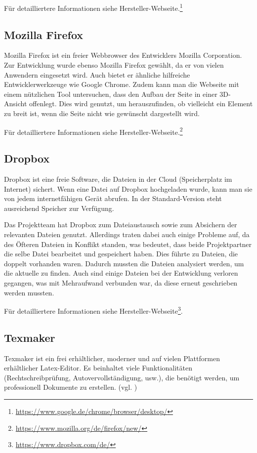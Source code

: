 Für detailliertere Informationen siehe Hersteller-Webseite.\footnote{\url{https://www.google.de/chrome/browser/desktop/}} \\ 

\subsection{Mozilla Firefox}
Mozilla Firefox ist ein freier Webbrowser des Entwicklers Mozilla Corporation. 
Zur Entwicklung wurde ebenso Mozilla Firefox gewählt, da er von vielen Anwendern eingesetzt wird. Auch bietet er ähnliche hilfreiche Entwicklerwerkzeuge wie Google Chrome. Zudem kann man die Webseite mit einem nützlichen Tool untersuchen, dass den Aufbau der Seite in einer 3D-Ansicht offenlegt. Dies wird genutzt, um herauszufinden, ob vielleicht ein Element zu breit ist, wenn die Seite nicht wie gewünscht dargestellt wird.

Für detailliertere Informationen siehe Hersteller-Webseite.\footnote{\url{https://www.mozilla.org/de/firefox/new/}} \\ 

\subsection{Dropbox}
Dropbox ist eine freie Software, die Dateien in der Cloud (Speicherplatz im Internet) sichert. Wenn eine Datei auf Dropbox hochgeladen wurde, kann man sie von jedem internetfähigen Gerät abrufen. In der Standard-Version steht ausreichend Speicher zur Verfügung.

Das Projektteam hat Dropbox zum Dateiaustausch sowie zum Absichern der relevanten Dateien genutzt. Allerdings traten dabei auch einige Probleme auf, da des Öfteren Dateien in \glqq Konflikt\grqq{} standen, was bedeutet, dass beide Projektpartner die selbe Datei bearbeitet und gespeichert haben. Dies führte zu Dateien, die doppelt vorhanden waren. Dadurch mussten die Dateien analysiert werden, um die aktuelle zu finden. Auch sind einige Dateien bei der Entwicklung verloren gegangen, was mit Mehraufwand verbunden war, da diese erneut geschrieben werden mussten.

Für detailliertere Informationen siehe Hersteller-Webseite\footnote{\url{https://www.dropbox.com/de/}}. \\

\subsection{Texmaker}
Texmaker ist ein frei erhältlicher, moderner und auf vielen Plattformen erhältlicher Latex-Editor. Es beinhaltet viele Funktionalitäten (Rechtschreibprüfung, Autovervollständigung, usw.), die benötigt werden, um professionell Dokumente zu erstellen. (vgl. \cite{texmaker})

